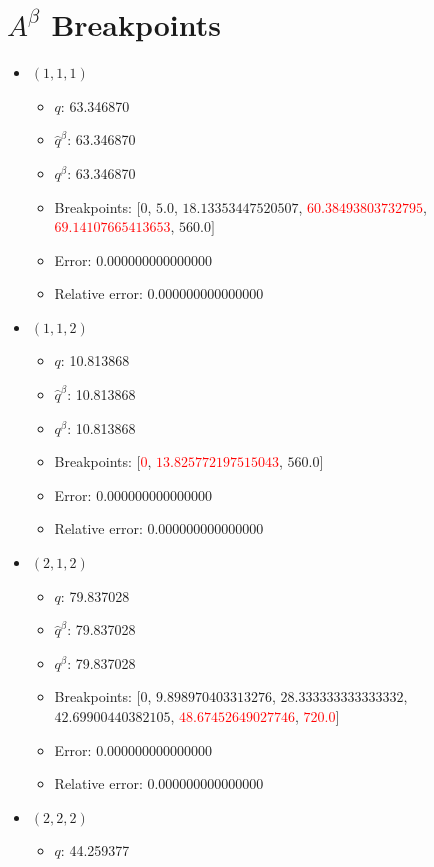 \documentclass{article}%
\begin{document}
\clearpage%
\section{$A^\beta$ Breakpoints}%
\thispagestyle{plain}%
\begin{itemize}%
	\item $(1, 1, 1)$%
	\begin{itemize}%
		\item $q$: 63.346870%
		\item $\hat{q}^\beta$: 63.346870%
		\item $q^\beta$: 63.346870%
		\item Breakpoints: $[$$0$, $5.0$, $18.13353447520507$, \textcolor{red}{$60.38493803732795$}, \textcolor{red}{$69.14107665413653$}, $560.0$$]$%
		\item Error: 0.000000000000000%
		\item Relative error: 0.000000000000000%
	\end{itemize}%
	\item $(1, 1, 2)$%
	\begin{itemize}%
		\item $q$: 10.813868%
		\item $\hat{q}^\beta$: 10.813868%
		\item $q^\beta$: 10.813868%
		\item Breakpoints: $[$\textcolor{red}{$0$}, \textcolor{red}{$13.825772197515043$}, $560.0$$]$%
		\item Error: 0.000000000000000%
		\item Relative error: 0.000000000000000%
	\end{itemize}%
	\item $(2, 1, 2)$%
	\begin{itemize}%
		\item $q$: 79.837028%
		\item $\hat{q}^\beta$: 79.837028%
		\item $q^\beta$: 79.837028%
		\item Breakpoints: $[$$0$, $9.898970403313276$, $28.333333333333332$, $42.69900440382105$, \textcolor{red}{$48.67452649027746$}, \textcolor{red}{$720.0$}$]$%
		\item Error: 0.000000000000000%
		\item Relative error: 0.000000000000000%
	\end{itemize}%
	\item $(2, 2, 2)$%
	\begin{itemize}%
		\item $q$: 44.259377%

\end{itemize}
\end{itemize}
\end{document}
